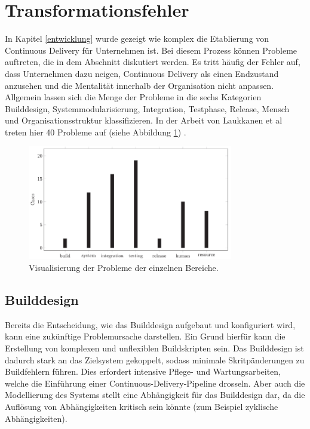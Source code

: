\section{Transformationsfehler} \label{Fehler bei der Transformation}
In Kapitel \ref{entwicklung} wurde gezeigt wie komplex die Etablierung von Continuous Delivery für Unternehmen ist. Bei diesem Prozess können Probleme auftreten, die in dem Abschnitt diskutiert werden. Es tritt häufig der Fehler auf, dass Unternehmen dazu neigen, Continuous Delivery als einen Endzustand anzusehen und die Mentalität innerhalb der Organisation nicht anpassen. Allgemein lassen sich die Menge der Probleme in die sechs Kategorien Builddesign, Systemmodularisierung, Integration, Testphase, Release, Mensch und Organisationsstruktur klassifizieren. In der Arbeit von Laukkanen et al treten hier 40 Probleme auf (siehe Abbildung \ref{studie}) \cite{Laukkanen.2017}. 

\begin{figure}[ht]
	\centering
	\includegraphics[width=0.8\textwidth,]{images/Transformationproblems}
	\caption{Visualisierung der Probleme der einzelnen Bereiche\cite{Laukkanen.2017}.}
	\label{studie}
\end{figure}

\subsection{Builddesign} \label{builddesgin}
Bereits die Entscheidung, wie das Builddesign aufgebaut und konfiguriert wird, kann eine zukünftige Problemursache darstellen. Ein Grund hierfür kann die Erstellung von komplexen und unflexiblen Buildskripten sein. Das Builddesign ist dadurch stark an das Zielsystem gekoppelt, sodass minimale Skritpänderungen zu Buildfehlern führen. Dies erfordert intensive Pflege- und Wartungsarbeiten, welche die Einführung einer Continuous-Delivery-Pipeline drosseln. Aber auch die Modellierung des Systems stellt eine Abhängigkeit für das Builddesign dar, da die Auflösung von Abhängigkeiten kritisch sein könnte (zum Beispiel zyklische Abhängigkeiten).

